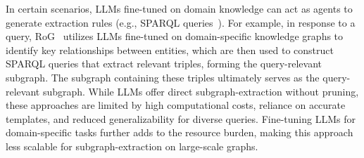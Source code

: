 {%
In certain scenarios, LLMs fine-tuned on domain knowledge can act as agents {\cite{RoG,ChatKBQA}} to generate extraction rules (e.g., SPARQL queries~\cite{ScalableSPARQL, SurveySPARQL, ChatKBQA}).
For example, in response to a query, RoG~\cite{RoG} utilizes LLMs fine-tuned on domain-specific knowledge graphs to identify key relationships between entities, which are then used to construct SPARQL queries that extract relevant triples, forming the query-relevant subgraph.
The subgraph containing these triples ultimately serves as the query-relevant subgraph. While LLMs offer direct subgraph-extraction without pruning, these approaches are limited by high computational costs, reliance on accurate templates, and reduced generalizability for diverse queries. Fine-tuning LLMs for domain-specific tasks further adds to the resource burden, making this approach less scalable for subgraph-extraction on large-scale graphs.




}
